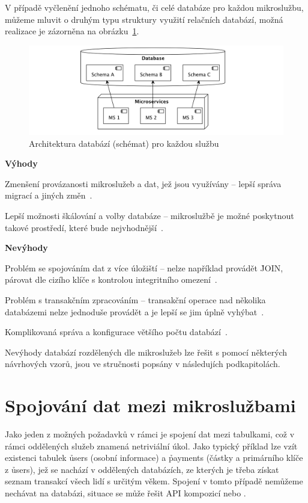 V případě vyčlenění jednoho schématu, či celé databáze pro každou mikroslužbu, můžeme mluvit o druhým typu struktury využití relačních databází, možná realizace je zázorněna na obrázku~\ref{fig:db-per-micro}.

\begin{figure}[htbp]
   \centering
   \includegraphics[max width=\textwidth]{assets/db-per-micro}
   \caption{Architektura databází (schémat) pro každou službu}\label{fig:db-per-micro}
\end{figure}



\textbf{Výhody}
\begin{ul}
   \item Zmenšení provázanosti mikroslužeb a dat, jež jsou využívány – lepší správa migrací a jiných změn~\cite{dbperservice}.
   \item Lepší možnosti škálování a volby databáze – mikroslužbě je možné poskytnout takové prostředí, které bude nejvhodnější~\cite{dbperservice}.
\end{ul}

\textbf{Nevýhody}
\begin{ul}
   \item Problém se spojováním dat z více úložiští – nelze například provádět \h{JOIN}, párovat dle cizího klíče s kontrolou integritního omezení~\cite{dbperservice}.
   \item Problém s transakčním zpracováním – transakční operace nad několika databázemi nelze jednoduše provádět a je lepší se jim úplně vyhýbat~\cite{dbperservice}.
   \item Komplikovaná správa a konfigurace většího počtu databází~\cite{dbperservice}.
\end{ul}

Nevýhody databází rozdělených dle mikroslužeb lze řešit s pomocí některých návrhových vzorů, jsou ve stručnosti popsány v následujích podkapitolách.



\section{Spojování dat mezi mikroslužbami}\label{sec:msa-db-join}
Jako jeden z možných požadavků v rámci  je spojení dat mezi tabulkami, což v rámci oddělených služeb znamená netriviální úkol.
Jako typický příklad lze vzít existenci tabulek \h{users} (osobní informace) a \h{payments} (částky a primárního klíče z \h{users}), jež se nachází v oddělených databázích, ze kterých je třeba získat seznam transakcí všech lidí s určitým věkem.
Spojení v tomto případě nemůžeme nechávat na databázi, situace se může řešit API kompozicí nebo .



